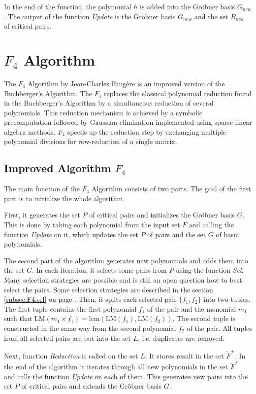 In the end of the function, the polynomial $h$ is added into the Gr\"obner basis $G_{new}$. The output of the function \textit{Update} is the Gr\"obner basis $G_{new}$ and the set $B_{new}$ of critical pairs.



\section{$F_4$ Algorithm}
The $F_4$ Algorithm \cite{F4} by Jean-Charles Faug\`ere is an improved version of the Buchberger's Algorithm. The $F_4$ replaces the classical polynomial reduction found in the Buchberger's Algorithm by a simultaneous reduction of several polynomials. This reduction mechanism is achieved by a symbolic precomputation followed by Gaussian elimination implemented using sparse linear algebra methods. $F_4$ speeds up the reduction step by exchanging multiple polynomial divisions for row-reduction of a single matrix.

\subsection{Improved Algorithm $F_4$}
The main function of the $F_4$ Algorithm consists of two parts. The goal of the first part is to initialize the whole algorithm.

First, it generates the set $P$ of critical pairs and initializes the Gr\"obner basis $G$. This is done by taking each polynomial from the input set $F$ and calling the function \textit{Update} on it, which updates the set $P$ of pairs and the set $G$ of basic polynomials.

The second part of the algorithm generates new polynomials and adds them into the set $G$. In each iteration, it selects some pairs from $P$ using the function \textit{Sel}. Many selection strategies are possible and is still an open question how to best select the pairs. Some selection strategies are described in the section \ref{subsec:F4:sel} on page \pageref{subsec:F4:sel}. Then, it splits each selected pair $\{f_1, f_2\}$ into two tuples. The first tuple contains the first polynomial $f_1$ of the pair and the monomial $m_1$ such that $\textrm{LM}(m_1 \times f_1) = \textrm{lcm}(\textrm{LM}(f_1),\textrm{LM}(f_2))$. The second tuple is constructed in the same way from the second polynomial $f_2$ of the pair. All tuples from all selected pairs are put into the set $L$, i.e. duplicates are removed.

Next, function \textit{Reduction} is called on the set $L$. It stores result in the set $\tilde{F}^+$. In the end of the algorithm it iterates through all new polynomials in the set $\tilde{F}^+$ and calls the function \textit{Update} on each of them. This generates new pairs into the set $P$ of critical pairs and extends the Gr\"obner basis $G$.

